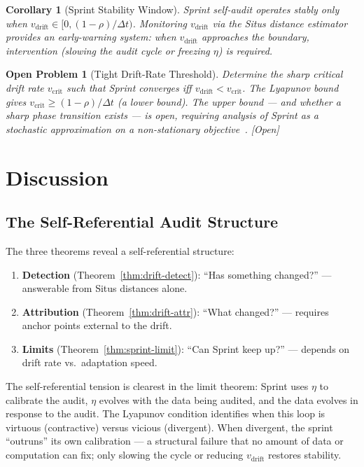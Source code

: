 \documentclass[12pt,a4paper]{article}
\newtheorem{corollary}[theorem]{Corollary}
\newtheorem{openproblem}[theorem]{Open Problem}
\newcommand{\openquest}{\textcolor{red!70!black}{\small\textsf{[Open]}}}
\begin{document}
\begin{corollary}[Sprint Stability Window]
\label{cor:stability}
Sprint self-audit operates stably only when
$v_{\mathrm{drift}} \in [0, (1-\rho)/\Delta t)$.  Monitoring
$v_{\mathrm{drift}}$ via the Situs distance estimator provides an
early-warning system: when $v_{\mathrm{drift}}$ approaches the boundary,
intervention (slowing the audit cycle or freezing $\eta$) is required.
\end{corollary}

\begin{openproblem}[Tight Drift-Rate Threshold]
\label{prob:tight-threshold}
Determine the \emph{sharp} critical drift rate $v_{\mathrm{crit}}$ such
that Sprint converges iff $v_{\mathrm{drift}} < v_{\mathrm{crit}}$.
The Lyapunov bound gives $v_{\mathrm{crit}} \geq (1-\rho)/\Delta t$
(a lower bound).  The upper bound — and whether a sharp phase transition
exists — is open, requiring analysis of Sprint as a stochastic
approximation on a non-stationary objective~\citep{benveniste1990adaptive}.
\openquest
\end{openproblem}

\section{Discussion}

\subsection{The Self-Referential Audit Structure}

The three theorems reveal a self-referential structure:
\begin{enumerate}[label=(\arabic*)]
    \item \textbf{Detection} (Theorem~\ref{thm:drift-detect}):
          ``Has something changed?'' — answerable from Situs distances alone.
    \item \textbf{Attribution} (Theorem~\ref{thm:drift-attr}):
          ``What changed?'' — requires anchor points external to the drift.
    \item \textbf{Limits} (Theorem~\ref{thm:sprint-limit}):
          ``Can Sprint keep up?'' — depends on drift rate vs.\ adaptation speed.
\end{enumerate}

The self-referential tension is clearest in the limit theorem: Sprint uses
$\eta$ to calibrate the audit, $\eta$ evolves with the data being audited,
and the data evolves in response to the audit.  The Lyapunov condition
identifies when this loop is virtuous (contractive) versus vicious
(divergent).  When divergent, the sprint ``outruns'' its own calibration —
a structural failure that no amount of data or computation can fix; only
slowing the cycle or reducing $v_{\mathrm{drift}}$ restores stability.
\end{document}
